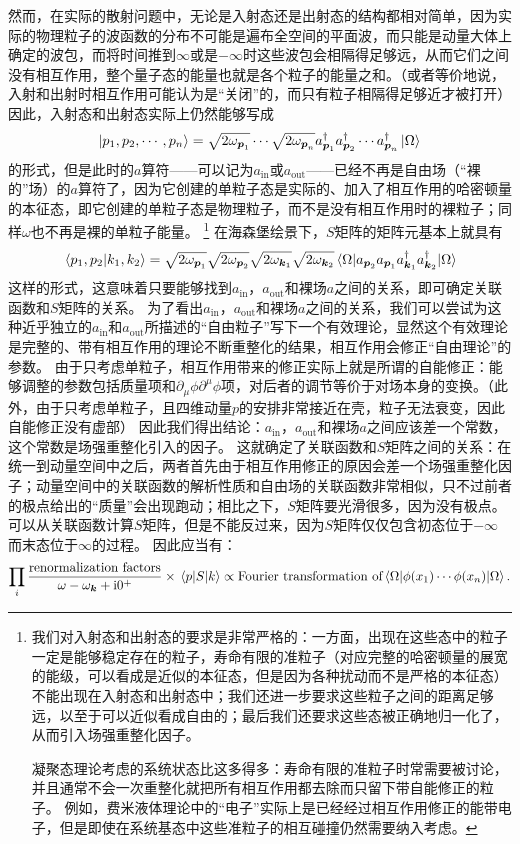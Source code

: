 \documentclass[hyperref, UTF8, a4paper]{ctexart}
\newcommand*{\ii}{\mathrm{i}}
\begin{document}
然而，在实际的散射问题中，无论是入射态还是出射态的结构都相对简单，因为实际的物理粒子的波函数的分布不可能是遍布全空间的平面波，而只能是动量大体上确定的波包，而将时间推到$\infty$或是$-\infty$时这些波包会相隔得足够远，从而它们之间没有相互作用，整个量子态的能量也就是各个粒子的能量之和。（或者等价地说，入射和出射时相互作用可能认为是“关闭”的，而只有粒子相隔得足够近才被打开）
因此，入射态和出射态实际上仍然能够写成
\[
    \ket{p_1, p_2, \cdots, p_n} = \sqrt{2\omega_{\vb*{p}_1}} \cdots \sqrt{2\omega_{\vb*{p}_n}} a^\dagger_{\vb*{p}_1} a^\dagger_{\vb*{p}_2} \cdots a^\dagger_{\vb*{p}_n} \ket{\Omega}
\]
的形式，但是此时的$a$算符——可以记为$a_\text{in}$或$a_\text{out}$——已经不再是自由场（“裸的”场）的$a$算符了，因为它创建的单粒子态是实际的、加入了相互作用的哈密顿量的本征态，即它创建的单粒子态是物理粒子，而不是没有相互作用时的裸粒子；同样$\omega$也不再是裸的单粒子能量。%
\footnote{
    我们对入射态和出射态的要求是非常严格的：一方面，出现在这些态中的粒子一定是能够稳定存在的粒子，寿命有限的准粒子（对应完整的哈密顿量的展宽的能级，可以看成是近似的本征态，但是因为各种扰动而不是严格的本征态）不能出现在入射态和出射态中；我们还进一步要求这些粒子之间的距离足够远，以至于可以近似看成自由的；最后我们还要求这些态被正确地归一化了，从而引入场强重整化因子。

    凝聚态理论考虑的系统状态比这多得多：寿命有限的准粒子时常需要被讨论，并且通常不会一次重整化就把所有相互作用都去除而只留下带自能修正的粒子。
    例如，费米液体理论中的“电子”实际上是已经经过相互作用修正的能带电子，但是即使在系统基态中这些准粒子的相互碰撞仍然需要纳入考虑。
}%
在海森堡绘景下，$S$矩阵的矩阵元基本上就具有
\[
    \braket*{p_1, p_2}{k_1, k_2} = \sqrt{2\omega_{\vb*{p}_1}} \sqrt{2\omega_{\vb*{p}_2}} \sqrt{2\omega_{\vb*{k}_1}} \sqrt{2\omega_{\vb*{k}_2}} \mel*{\Omega}{a_{\vb*{p}_2} a_{\vb*{p}_1} a^\dagger_{\vb*{k}_1} a^\dagger_{\vb*{k}_2}}{\Omega}
\]
这样的形式，这意味着只要能够找到$a_\text{in}$，$a_\text{out}$和裸场$a$之间的关系，即可确定关联函数和$S$矩阵的关系。
为了看出$a_\text{in}$，$a_\text{out}$和裸场$a$之间的关系，我们可以尝试为这种近乎独立的$a_\text{in}$和$a_\text{out}$所描述的“自由粒子”写下一个有效理论，显然这个有效理论是完整的、带有相互作用的理论不断重整化的结果，相互作用会修正“自由理论”的参数。
由于只考虑单粒子，相互作用带来的修正实际上就是所谓的自能修正：能够调整的参数包括质量项和$\partial_\mu \phi \partial^\mu \phi$项，对后者的调节等价于对场本身的变换。（此外，由于只考虑单粒子，且四维动量$p$的安排非常接近在壳，粒子无法衰变，因此自能修正没有虚部）
因此我们得出结论：$a_\text{in}$，$a_\text{out}$和裸场$a$之间应该差一个常数，这个常数是场强重整化引入的因子。
这就确定了关联函数和$S$矩阵之间的关系：在统一到动量空间中之后，两者首先由于相互作用修正的原因会差一个场强重整化因子；动量空间中的关联函数的解析性质和自由场的关联函数非常相似，只不过前者的极点给出的“质量”会出现跑动；相比之下，$S$矩阵要光滑很多，因为没有极点。
可以从关联函数计算$S$矩阵，但是不能反过来，因为$S$矩阵仅仅包含初态位于$-\infty$而末态位于$\infty$的过程。
因此应当有：
\[
    \prod_{i} \frac{\text{renormalization factors}}{\omega - \omega_{\vb*{k}} + \ii 0^+} \times \mel*{p}{S}{k} \propto \text{Fourier transformation of} \mel*{\Omega}{\phi(x_1) \cdots \phi(x_n)}{\Omega}.
\]
\end{document}
